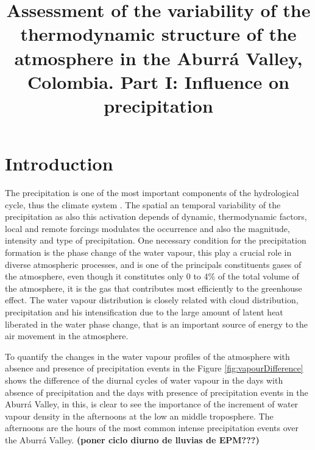 \documentclass{ametsoc}
\title{Assessment of the variability of the thermodynamic structure of the atmosphere in the Aburrá Valley, Colombia. Part I: Influence on precipitation}
\affiliation{Universidad Nacional de Colombia, Medellín, Colombia}
\begin{document}
\maketitle


%

\section{Introduction}
The precipitation is one of the most important components of the hydrological cycle, thus the climate system \citep{davies2011global}. The spatial an temporal variability of the precipitation as also this activation depends of dynamic, thermodynamic factors, local and remote forcings modulates the occurrence and also the magnitude, intensity and type of precipitation. One necessary condition for the precipitation formation is the phase change of the water vapour, this play a crucial role in diverse atmospheric processes, and is one of the principals constituents gases of the atmosphere, even though it constitutes only 0 to 4\% of the total volume of the atmosphere, it is the gas that contributes most efficiently to the greenhouse effect. The water vapour distribution is closely related with cloud distribution, precipitation and his intensification due to the large amount of latent heat liberated in the water phase change, that is an important source of energy to the air movement in the atmosphere.


To quantify the changes in the water vapour profiles of the atmosphere with absence and presence of precipitation events in the Figure \ref{fig:vapourDifference} shows the difference of the diurnal cycles of water vapour in the days with absence of precipitation and the days with presence of precipitation events in the Aburrá Valley, in this, is clear to see the importance of the increment of water vapour density in the afternoons at the low an middle troposphere. The afternoons are the hours of the most common intense precipitation events over the Aburrá Valley. \textbf{ (poner ciclo diurno de lluvias de EPM???)}
\end{document}

